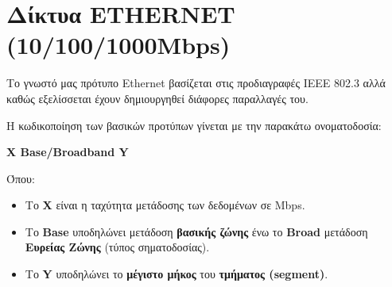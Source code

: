 %
%
\setcounter{section}{3}
\section{Δίκτυα ETHERNET (10/100/1000Mbps)}

Το γνωστό μας πρότυπο Ethernet βασίζεται στις προδιαγραφές IEEE 802.3 αλλά καθώς εξελίσσεται έχουν δημιουργηθεί διάφορες παραλλαγές του. 

Η κωδικοποίηση των βασικών προτύπων γίνεται με την παρακάτω ονοματοδοσία:

\textbf{Χ Base/Broadband Y}

Όπου:

\begin{itemize}
\item Το \textbf{X} είναι η ταχύτητα μετάδοσης των δεδομένων σε Mbps.
\item Το \textbf{Base} υποδηλώνει μετάδοση \textbf{βασικής ζώνης} ένω το \textbf{Broad} μετάδοση \textbf{Ευρείας Ζώνης} (τύπος σηματοδοσίας).
\item Το \textbf{Y} υποδηλώνει το \textbf{μέγιστο μήκος} του \textbf{τμήματος (segment)}.
\end{itemize}

